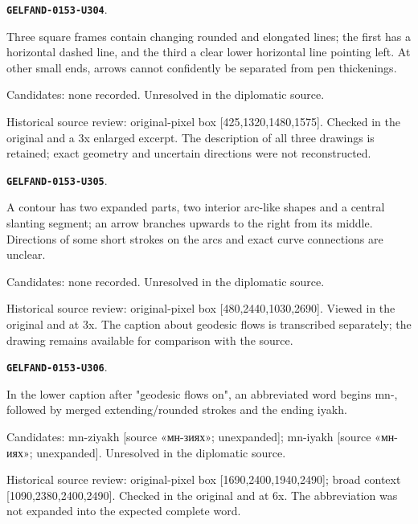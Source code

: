 \documentclass[11pt]{article}
\theoremstyle{definition}
\theoremstyle{remark}
\begin{document}
\par\noindent\leavevmode{}\label{GELFAND-0153-U304}\label{GELFAND-P001408:baker-sequence:note}\textbf{\texttt{GELFAND-0153-U304}}.\nopagebreak[4]\par
Three square frames contain changing rounded and elongated lines; the first has a horizontal dashed line, and the third a clear lower horizontal line pointing left. At other small ends, arrows cannot confidently be separated from pen thickenings.\par
Candidates: none recorded. Unresolved in the diplomatic source.\par
Historical source review: original-pixel box [425,1320,1480,1575]. Checked in the original and a 3x enlarged excerpt. The description of all three drawings is retained; exact geometry and uncertain directions were not reconstructed.\par\medskip
\par\noindent\leavevmode{}\label{GELFAND-0153-U305}\label{GELFAND-P001408:hyperbolic-surface:note}\textbf{\texttt{GELFAND-0153-U305}}.\nopagebreak[4]\par
A contour has two expanded parts, two interior arc-like shapes and a central slanting segment; an arrow branches upwards to the right from its middle. Directions of some short strokes on the arcs and exact curve connections are unclear.\par
Candidates: none recorded. Unresolved in the diplomatic source.\par
Historical source review: original-pixel box [480,2440,1030,2690]. Viewed in the original and at 3x. The caption about geodesic flows is transcribed separately; the drawing remains available for comparison with the source.\par\medskip
\par\noindent\leavevmode{}\label{GELFAND-0153-U306}\label{GELFAND-P001408:manifold-abbreviation:note}\textbf{\texttt{GELFAND-0153-U306}}.\nopagebreak[4]\par
In the lower caption after "geodesic flows on", an abbreviated word begins mn-, followed by merged extending/rounded strokes and the ending iyakh.\par
Candidates: mn-ziyakh [source «мн-зиях»; unexpanded]; mn-iyakh [source «мн-иях»; unexpanded]. Unresolved in the diplomatic source.\par
Historical source review: original-pixel box [1690,2400,1940,2490]; broad context [1090,2380,2400,2490]. Checked in the original and at 6x. The abbreviation was not expanded into the expected complete word.\par\medskip
\end{document}
